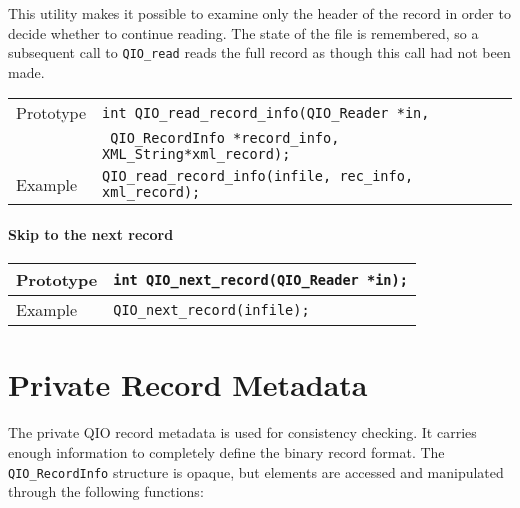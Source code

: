 \documentclass{article}
\newcommand{\QMDhandle}{{\tt XML\_String}}
\begin{document}
This utility makes it possible to examine only the header of the
record in order to decide whether to continue reading.  The state of
the file is remembered, so a subsequent call to \verb|QIO_read| reads
the full record as though this call had not been made.
%
\begin{flushleft}
  \begin{tabular}{|l|l|}
  \hline
  Prototype      & \verb|int QIO_read_record_info(QIO_Reader *in,| \\
                 & \verb| QIO_RecordInfo *record_info,| \QMDhandle \verb|*xml_record);| \\
\hline
  Example  & \verb|QIO_read_record_info(infile, rec_info, xml_record);|\\
   \hline
 \end{tabular}
\end{flushleft}
%

\paragraph{Skip to the next record}

\begin{flushleft}
  \begin{tabular}{|l|l|}
  \hline
  Prototype      & \verb|int QIO_next_record(QIO_Reader *in);| \\
\hline
  Example  & \verb|QIO_next_record(infile);|\\
   \hline
 \end{tabular}
\end{flushleft}
%

\section{Private Record Metadata}


The private QIO record metadata is used for consistency checking.  It
carries enough information to completely define the binary record
format.  The \verb|QIO_RecordInfo| structure is opaque, but elements
are accessed and manipulated through the following functions:
\end{document}
